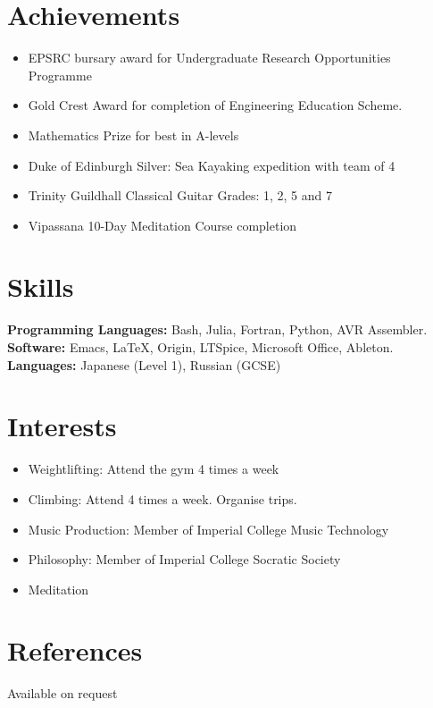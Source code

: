\documentclass[margin]{res}
\begin{document}
\begin{resume}
\section{Achievements} 
\begin{itemize}\itemsep -2pt
\item EPSRC bursary award for Undergraduate Research Opportunities Programme
\item Gold Crest Award for completion of Engineering Education Scheme.
\item Mathematics Prize for best in A-levels
\item Duke of Edinburgh Silver: Sea Kayaking expedition with team of 4  
\item Trinity Guildhall Classical Guitar Grades: 1, 2, 5 and 7
\item Vipassana 10-Day Meditation Course completion

 \end{itemize}

\singlespacing
\section{Skills}
   {\bf Programming Languages:} 
 Bash, Julia, Fortran, Python, AVR Assembler.\\
     {\bf Software:} 
 Emacs, \LaTeX, Origin, LTSpice, Microsoft Office, Ableton.\\
{\bf Languages:}
 Japanese (Level 1), Russian (GCSE)
\singlespacing

\section{Interests}
\begin{itemize}\itemsep -2pt
\item Weightlifting: Attend the gym 4 times a week
\item Climbing: Attend 4 times a week. Organise trips.
\item Music Production: Member of Imperial College Music Technology
\item Philosophy: Member of Imperial College Socratic Society
\item Meditation
\end{itemize}
\section{References}
Available on request

\end{resume} 
\end{document}
